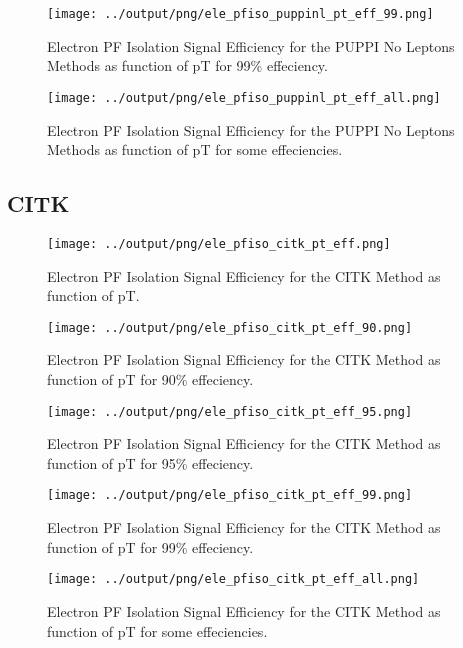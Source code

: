 \documentclass[11pt]{book}
\begin{document}
\begin{figure}[htb]
\centering
\texttt{[image: ../output/png/ele\_pfiso\_puppinl\_pt\_eff\_99.png]}
\caption{Electron PF Isolation Signal Efficiency for the PUPPI No Leptons Methods as function of pT for 99\% effeciency.}
\label{fig:ele_pfiso_pt_eff_puppinl_eff_99}
\end{figure}

\begin{figure}[htb]
\centering
\texttt{[image: ../output/png/ele\_pfiso\_puppinl\_pt\_eff\_all.png]}
\caption{Electron PF Isolation Signal Efficiency for the PUPPI No Leptons Methods as function of pT for some effeciencies.}
\label{fig:ele_pfiso_pt_eff_puppinl_eff_all}
\end{figure}
\clearpage

\subsection{CITK}
\begin{figure}[htb]
\centering
\texttt{[image: ../output/png/ele\_pfiso\_citk\_pt\_eff.png]}
\caption{Electron PF Isolation Signal Efficiency for the CITK Method as function of pT.}
\label{fig:ele_pfiso_pt_eff_citk}
\end{figure}

\begin{figure}[htb]
\centering
\texttt{[image: ../output/png/ele\_pfiso\_citk\_pt\_eff\_90.png]}
\caption{Electron PF Isolation Signal Efficiency for the CITK Method as function of pT for 90\% effeciency.}
\label{fig:ele_pfiso_pt_eff_citk_eff_90}
\end{figure}

\begin{figure}[htb]
\centering
\texttt{[image: ../output/png/ele\_pfiso\_citk\_pt\_eff\_95.png]}
\caption{Electron PF Isolation Signal Efficiency for the CITK Method as function of pT for 95\% effeciency.}
\label{fig:ele_pfiso_pt_eff_citk_eff_95}
\end{figure}

\begin{figure}[htb]
\centering
\texttt{[image: ../output/png/ele\_pfiso\_citk\_pt\_eff\_99.png]}
\caption{Electron PF Isolation Signal Efficiency for the CITK Method as function of pT for 99\% effeciency.}
\label{fig:ele_pfiso_pt_eff_citk_eff_99}
\end{figure}

\begin{figure}[htb]
\centering
\texttt{[image: ../output/png/ele\_pfiso\_citk\_pt\_eff\_all.png]}
\caption{Electron PF Isolation Signal Efficiency for the CITK Method as function of pT for some effeciencies.}
\label{fig:ele_pfiso_pt_eff_citk_eff_all}
\end{figure}
\clearpage
\end{document}
